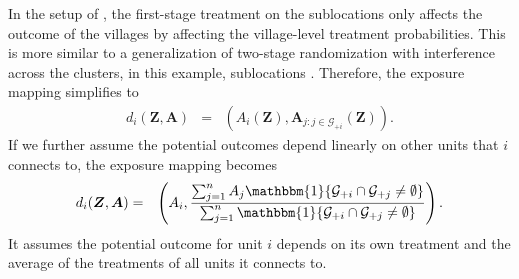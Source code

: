 \documentclass{article}
\newenvironment{continuance}[1]
{%
  \newcommand{\continuanceref}{\ref{#1}}%
  \continuancex %
}
{\endcontinuancex}
\newcommand{\bZ}{\boldsymbol{Z}}
\newcommand{\bA}{\boldsymbol{A}}
\newcommand{\indicator}{\mathbbm{1}}
\newcommand{\cG}{\mathcal{G}}
\newcommand{\sumj}{\sum_{j=1}^n}
\begin{document}
\begin{continuance}{exmp::egger}
    In the setup of \cite{egger2022general}, the first-stage treatment on the sublocations only affects the outcome of the villages by affecting the village-level treatment probabilities. This is more similar to a generalization of two-stage randomization with interference across the clusters, in this example, sublocations \citep{hudgens2008toward, basse2018analyzing}. Therefore, the exposure mapping simplifies to 
    \begin{eqnarray*}
        d_i(\bZ,\bA) &=& (A_i(\bZ),\bA_{j:j\in\cG_{+i}}(\bZ)).
    \end{eqnarray*}
    If we further assume the potential outcomes depend linearly on other units that $i$ connects to, the exposure mapping becomes
    \begin{eqnarray*}
        d_i(\bZ,\bA) &=& \left(A_i,\frac{\sumj A_j \indicator\{\cG_{+i} \cap \cG_{+j} \neq \emptyset\}}{\sumj \indicator\{\cG_{+i} \cap \cG_{+j} \neq \emptyset\}} \right).
    \end{eqnarray*}
    It assumes the potential outcome for unit $i$ depends on its own treatment and the average of the treatments of all units it connects to.
\end{continuance}
\end{document}
